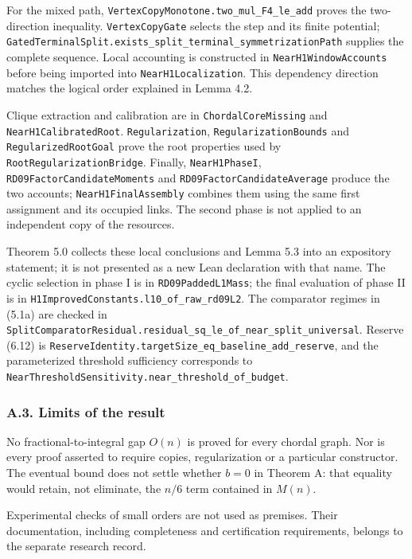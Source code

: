 \documentclass[english,11pt,a4paper]{article}
\begin{document}
For the mixed path, \nolinkurl{VertexCopyMonotone.two_mul_F4_le_add} proves the two-direction inequality. \nolinkurl{VertexCopyGate} selects the step and its finite potential; \nolinkurl{GatedTerminalSplit.exists_split_terminal_symmetrizationPath} supplies the complete sequence. Local accounting is constructed in \nolinkurl{NearH1WindowAccounts} before being imported into \nolinkurl{NearH1Localization}. This dependency direction matches the logical order explained in Lemma 4.2.

Clique extraction and calibration are in \nolinkurl{ChordalCoreMissing} and \nolinkurl{NearH1CalibratedRoot}. \nolinkurl{Regularization}, \nolinkurl{RegularizationBounds} and \nolinkurl{RegularizedRootGoal} prove the root properties used by \nolinkurl{RootRegularizationBridge}. Finally, \nolinkurl{NearH1PhaseI}, \nolinkurl{RD09FactorCandidateMoments} and \nolinkurl{RD09FactorCandidateAverage} produce the two accounts; \nolinkurl{NearH1FinalAssembly} combines them using the same first assignment and its occupied links. The second phase is not applied to an independent copy of the resources.

Theorem 5.0 collects these local conclusions and Lemma 5.3 into an expository statement; it is not presented as a new Lean declaration with that name. The cyclic selection in phase I is in \nolinkurl{RD09PaddedL1Mass}; the final evaluation of phase II is in \nolinkurl{H1ImprovedConstants.l10_of_raw_rd09L2}. The comparator regimes in (5.1a) are checked in \nolinkurl{SplitComparatorResidual.residual_sq_le_of_near_split_universal}. Reserve (6.12) is \nolinkurl{ReserveIdentity.targetSize_eq_baseline_add_reserve}, and the parameterized threshold sufficiency corresponds to \nolinkurl{NearThresholdSensitivity.near_threshold_of_budget}.

\subsubsection{A.3. Limits of the result}\label{a.3.-limits-of-the-result}

No fractional-to-integral gap \(O(n)\) is proved for every chordal graph. Nor is every proof asserted to require copies, regularization or a particular constructor. The eventual bound does not settle whether \(b=0\) in Theorem A: that equality would retain, not eliminate, the \(n/6\) term contained in \(M(n)\).

Experimental checks of small orders are not used as premises. Their documentation, including completeness and certification requirements, belongs to the separate research record.
\end{document}
